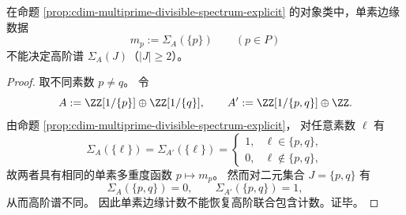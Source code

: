 \begin{proposition}[单素多重度不足以恢复高阶谱]\label{prop:cdim-higher-spectrum-not-determined-by-marginals}
在命题 \ref{prop:cdim-multiprime-divisible-spectrum-explicit} 的对象类中，单素边缘数据
\[
m_p:=\Sigma_A(\{p\})\qquad(p\in P)
\]
不能决定高阶谱 \(\Sigma_A(J)\)（\(|J|\ge 2\)）。
\end{proposition}

\begin{proof}
取不同素数 \(p\neq q\)。
令
\[
A:=\ZZ[1/\{p\}]\oplus \ZZ[1/\{q\}],
\qquad
A':=\ZZ[1/\{p,q\}]\oplus \ZZ.
\]
由命题 \ref{prop:cdim-multiprime-divisible-spectrum-explicit}，
对任意素数 \(\ell\) 有
\[
\Sigma_A(\{\ell\})=\Sigma_{A'}(\{\ell\})=
\begin{cases}
1, & \ell\in\{p,q\},\\
0, & \ell\notin\{p,q\},
\end{cases}
\]
故两者具有相同的单素多重度函数 \(p\mapsto m_p\)。
然而对二元集合 \(J=\{p,q\}\) 有
\[
\Sigma_A(\{p,q\})=0,
\qquad
\Sigma_{A'}(\{p,q\})=1,
\]
从而高阶谱不同。
因此单素边缘计数不能恢复高阶联合包含计数。证毕。
\end{proof}

\endinput
